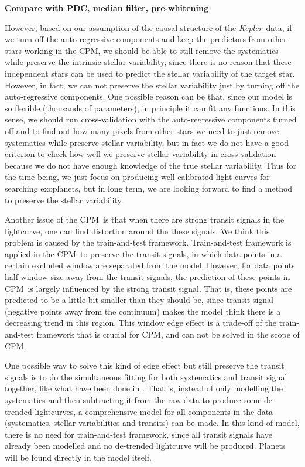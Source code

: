 \documentclass[12pt, preprint]{aastex}
\newcommand{\project}[1]{\textsl{#1}}
\newcommand{\Kepler}{\project{Kepler}}
\newcommand{\name}{CPM}
\newcommand{\todo}[1]{\textbf{#1}}
\begin{document}
\todo{Compare with PDC, median filter, pre-whitening}


However, based on our assumption of the causal structure of the \Kepler\ data, 
  if we turn off the auto-regressive components and keep the predictors from other stars working in the \name, 
  we should be able to still remove the systematics while preserve the intrinsic stellar variability, 
  since there is no reason that these independent stars can be used to predict the stellar variability of the target star.
However, in fact, we can not preserve the stellar variability just by turning off the auto-regressive components. 
One possible reason can be that, since our model is so flexible (thousands of parameters), 
  in principle it can fit any functions. 
In this sense, 
  we should run cross-validation with the auto-regressive components turned off 
  and to find out how many pixels from other stars we need to just remove systematics 
  while preserve stellar variability, 
  but in fact we do not have a good criterion to check how well we preserve stellar variability in cross-validation 
  because we do not have enough knowledge of the true stellar variability. 
Thus for the time being, we just focus on producing well-calibrated light curves for searching exoplanets, 
  but in long term, we are looking forward to find a method to preserve the stellar variability.

Another issue of the \name\ is that when there are strong transit signals in the lightcurve,  
  one can find distortion around the these signals.
We think this problem is caused by the train-and-test framework.
Train-and-test framework is applied in the \name\ to preserve the transit signals, 
  in which data points in a certain excluded window are separated from the model.
However, for data points half-window size away from the transit signals, 
  the prediction of these points in \name\ is largely influenced by the strong transit signal.
That is,  these points are predicted to be a little bit smaller than they should be, 
  since transit signal (negative points away from the continuum) makes the model think
  there is a decreasing trend in this region.
This window edge effect is a trade-off of the train-and-test framework that is crucial for \name,
 and can not be solved in the scope of \name.

One possible way to solve this kind of edge effect 
  but still preserve the transit signals is to do the simultaneous fitting 
  for both systematics and transit signal together, 
  like what have been done in \cite{dfm}. 
That is,  
  instead of only modelling the systematics 
  and then subtracting it from the raw data to produce some de-trended lightcurves,
  a comprehensive model for all components in the data (systematics, stellar variabilities and transits)  can be made. In this kind of model, there is no need for train-and-test framework,
  since all transit signals have already been modelled 
  and no de-trended lightcurve will be produced. Planets will be found directly in the model itself. 
\end{document}
